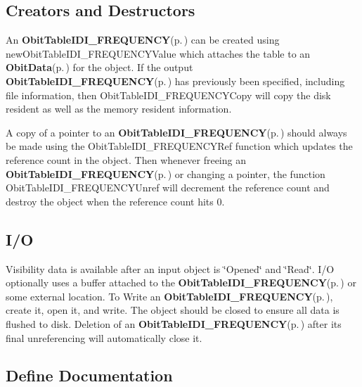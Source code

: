 \subsection{Creators and Destructors}\label{ObitTableIDI__FREQUENCY_8h_ObitTableIDI_FREQUENCYaccess}
An {\bf Obit\-Table\-IDI\_\-FREQUENCY}{\rm (p.\,\pageref{structObitTableIDI__FREQUENCY})} can be created using new\-Obit\-Table\-IDI\_\-FREQUENCYValue which attaches the table to an {\bf Obit\-Data}{\rm (p.\,\pageref{structObitData})} for the object. If the output {\bf Obit\-Table\-IDI\_\-FREQUENCY}{\rm (p.\,\pageref{structObitTableIDI__FREQUENCY})} has previously been specified, including file information, then Obit\-Table\-IDI\_\-FREQUENCYCopy will copy the disk resident as well as the memory resident information.

A copy of a pointer to an {\bf Obit\-Table\-IDI\_\-FREQUENCY}{\rm (p.\,\pageref{structObitTableIDI__FREQUENCY})} should always be made using the Obit\-Table\-IDI\_\-FREQUENCYRef function which updates the reference count in the object. Then whenever freeing an {\bf Obit\-Table\-IDI\_\-FREQUENCY}{\rm (p.\,\pageref{structObitTableIDI__FREQUENCY})} or changing a pointer, the function Obit\-Table\-IDI\_\-FREQUENCYUnref will decrement the reference count and destroy the object when the reference count hits 0.\subsection{I/O}\label{ObitTableIDI__FREQUENCY_8h_ObitTableIDI_FREQUENCYUsage}
Visibility data is available after an input object is \char`\"{}Opened\char`\"{} and \char`\"{}Read\char`\"{}. I/O optionally uses a buffer attached to the {\bf Obit\-Table\-IDI\_\-FREQUENCY}{\rm (p.\,\pageref{structObitTableIDI__FREQUENCY})} or some external location. To Write an {\bf Obit\-Table\-IDI\_\-FREQUENCY}{\rm (p.\,\pageref{structObitTableIDI__FREQUENCY})}, create it, open it, and write. The object should be closed to ensure all data is flushed to disk. Deletion of an {\bf Obit\-Table\-IDI\_\-FREQUENCY}{\rm (p.\,\pageref{structObitTableIDI__FREQUENCY})} after its final unreferencing will automatically close it.

\subsection{Define Documentation}
